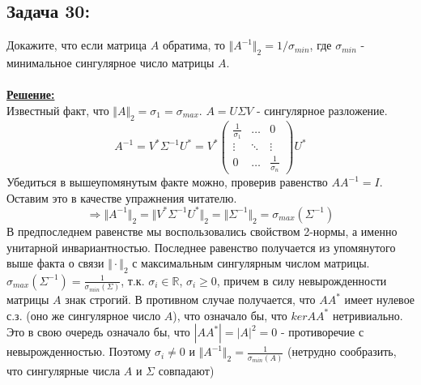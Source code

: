 \documentclass[a4paper,12pt,titlepage,final]{article}
\begin{document}
\subsection*{Задача 30:}
\noindent Докажите, что если матрица $A$ обратима, то $\Vert A^{-1} \Vert_2 = 1 / \sigma_{min}$, где $\sigma_{min}$ - минимальное сингулярное число матрицы $A$.\\ \\
\textbf{\underline{Решение:}} \\
Известный факт, что $\Vert A \Vert_2 = \sigma_1 = \sigma_{max}$. $A = U\Sigma V$ - сингулярное разложение.
$$ A^{-1} = V^*\Sigma^{-1}U^* = V^*
\begin{pmatrix}
\frac{1}{\sigma_1} & \ldots & 0 \\
\vdots & \ddots & \vdots \\
0 & \ldots & \frac{1}{\sigma_n} 
\end{pmatrix} U^*
$$
Убедиться в вышеупомянутым факте можно, проверив равенство $AA^{-1} = I$. Оставим это в качестве упражнения читателю.
$$
\Rightarrow \Vert A^{-1} \Vert_2 = \Vert V^*\Sigma^{-1}U^* \Vert_2 = \Vert \Sigma^{-1} \Vert_2 = \sigma_{max}(\Sigma^{-1})$$
В предпоследнем равенстве мы воспользовались свойством 2-нормы, а именно унитарной инвариантностью. Последнее равенство получается из упомянутого выше факта о связи $\Vert \cdot \Vert_2$ с максимальным сингулярным числом матрицы. \\
$\sigma_{max}(\Sigma^{-1}) = \frac{1}{\sigma_{min}(\Sigma)}$, т.к. $\sigma_i \in \mathbb{R}$, $\sigma_i \geq 0$, причем в силу невырожденности матрицы $A$ знак строгий. В противном случае получается, что $AA^*$ имеет нулевое с.з. 
(оно же сингулярное число $A$), что означало бы, что $kerAA^*$ нетривиально. Это в свою очередь означало бы, что $|AA^*| = |A|^2 = 0$ - противоречие с невырожденностью. 
Поэтому $\sigma_i \neq 0$ и $\Vert A^{-1} \Vert_2 = \frac{1}{\sigma_{min}(A)}$ (нетрудно сообразить, что сингулярные числа $A$ и $\Sigma$ совпадают) \blacksquare \\ \\ \\

\end{document}
